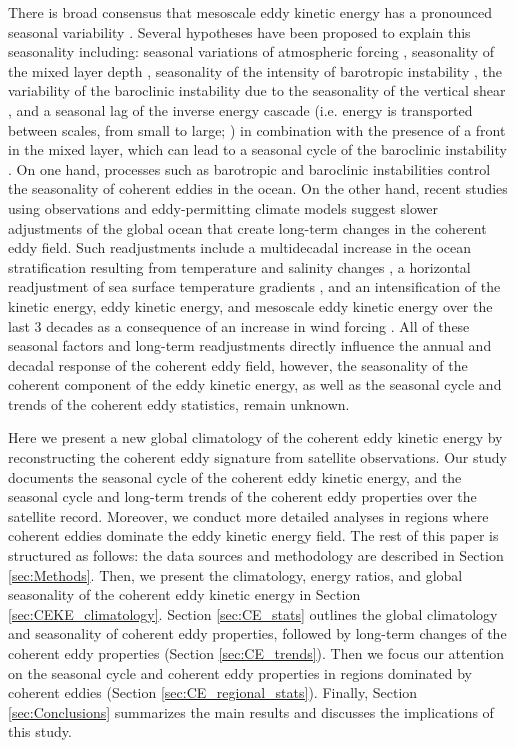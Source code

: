 \documentclass[draft,linenumbers]{agujournal2019}
\begin{document}
There is broad consensus that mesoscale eddy kinetic energy has a pronounced seasonal variability \citep{Qiu_seasonal_1999,Qiu_seasonal_2004,Kang_On_2017,Uchida_Seasonality_2017}. 
Several hypotheses have been proposed to explain this seasonality including: seasonal variations of atmospheric forcing \citep{Sasaki_seasonal_2014}, seasonality of the mixed layer depth \citep{Qiu_seasonal_2014,Callies_season_2015}, seasonality of the intensity of barotropic instability \citep{Qiu_seasonal_2004}, the variability of the baroclinic instability due to the seasonality of the vertical shear \citep{Qiu_seasonal_1999}, and a seasonal lag of the inverse energy cascade (i.e. energy is transported between scales, from small to large; \citealp{Arbic_cascade_2013}) in combination with the presence of a front in the mixed layer, which can lead to a seasonal cycle of the baroclinic instability \citep{Qiu_seasonal_2014}. On one hand, processes such as barotropic and baroclinic instabilities control the seasonality of coherent eddies in the ocean. 
On the other hand, recent studies using observations and eddy-permitting climate models suggest slower adjustments of the global ocean that create long-term changes in the coherent eddy field. 
Such readjustments include a multidecadal increase in the ocean stratification resulting from temperature and salinity changes \citep{Li_stratification_2020}, a horizontal readjustment of sea surface temperature gradients \citep{Cane_sst_trends_1997,Bouali_SST_grad_trends_2017,Ruela_SST_trends_2020}, and an intensification of the kinetic energy, eddy kinetic energy, and mesoscale eddy kinetic energy over the last 3 decades as a consequence of an increase in wind forcing \citep{Hu_acceleration_2020,Wunsch_speeding_2020,Martinez_Kinetic_2021}. 
All of these seasonal factors and long-term readjustments directly influence the annual and decadal response of the coherent eddy field, however, the seasonality of the coherent component of the eddy kinetic energy, as well as the seasonal cycle and trends of the coherent eddy statistics, remain unknown.

Here we present a new global climatology of the coherent eddy kinetic energy by reconstructing the coherent eddy signature from satellite observations. Our study documents the seasonal cycle of the coherent eddy kinetic energy, and the seasonal cycle and long-term trends of the coherent eddy properties over the satellite record. 
Moreover, we conduct more detailed analyses in regions where coherent eddies dominate the eddy kinetic energy field. 
The rest of this paper is structured as follows:  the data sources and methodology are described in Section \ref{sec:Methods}.
Then, we present the climatology, energy ratios, and global seasonality of the coherent eddy kinetic energy in Section \ref{sec:CEKE_climatology}. 
Section \ref{sec:CE_stats} outlines the global climatology and seasonality of coherent eddy properties, followed by long-term changes of the coherent eddy properties (Section \ref{sec:CE_trends}). Then we focus our attention on the seasonal cycle and coherent eddy properties in regions dominated by coherent eddies (Section \ref{sec:CE_regional_stats}). 
Finally, Section \ref{sec:Conclusions} summarizes the main results and discusses the implications of this study.
\end{document}
